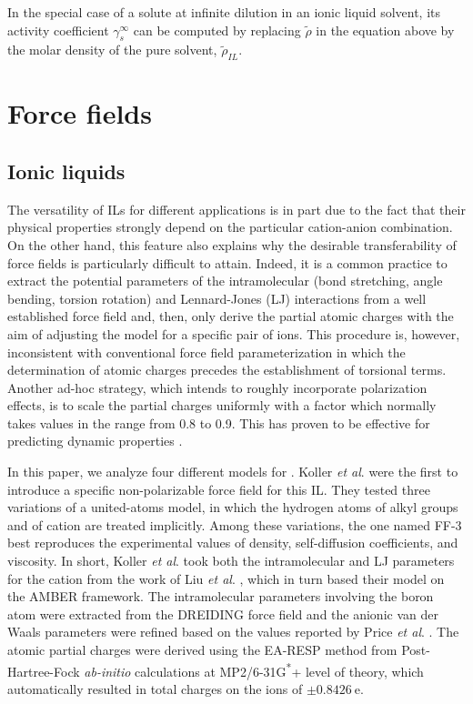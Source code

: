 \documentclass[3p,twocolumn]{elsarticle}
\begin{document}
In the special case of a solute at infinite dilution in an ionic liquid solvent, its activity coefficient $\gamma^\infty_s$ can be computed by replacing $\tilde{\rho}$ in the equation above by the molar density of the pure solvent, $\tilde{\rho}_\textit{IL}$.

\section{Force fields}
\label{sec:force_field}

\subsection{Ionic liquids}
\label{sec:force_field_il}

The versatility of ILs for different applications is in part due to the fact that their physical properties strongly depend on the particular cation-anion combination.
On the other hand, this feature also explains why the desirable transferability of force fields is particularly difficult to attain.
Indeed, it is a common practice to extract the potential parameters of the intramolecular (bond stretching, angle bending, torsion rotation) and Lennard-Jones (LJ) interactions from a well established force field and, then, only derive the partial atomic charges with the aim of adjusting the model for a specific pair of ions.
This procedure is, however, inconsistent with conventional force field parameterization in which the determination of atomic charges precedes the establishment of torsional terms.
Another ad-hoc strategy, which intends to roughly incorporate polarization effects, is to scale the partial charges uniformly with a factor which normally takes values in the range from 0.8 to 0.9.
This has proven to be effective for predicting dynamic properties \cite{Schr_der_2012}.

In this paper, we analyze four different models for \ce{[emim][B(CN)_4]}.
Koller \textit{et al}. \cite{Koller_2012} were the first to introduce a specific non-polarizable force field for this IL.
They tested three variations of a united-atoms model, in which the hydrogen atoms of alkyl groups  and  of cation \ce{[emim]^+} are treated implicitly.
Among these variations, the one named FF-3 best reproduces the experimental values of density, self-diffusion coefficients, and viscosity.
In short, Koller \textit{et al}. \cite{Koller_2012} took both the intramolecular and LJ parameters for the cation from the work of Liu \textit{et al}. \cite{Liu_2006}, which in turn based their model on the AMBER \cite{Cornell_1995} framework.
The intramolecular parameters involving the boron atom were extracted from the DREIDING \cite{Mayo_1990} force field and the anionic van der Waals parameters were refined based on the values reported by Price \textit{et al}. \cite{Price_2001}.
The atomic partial charges were derived using the EA-RESP method \cite{Basma_2001} from Post-Hartree-Fock \textit{ab-initio} calculations at MP2/6-31G\textsuperscript{*}+ level of theory, which automatically resulted in total charges on the ions of $\pm0.8426~\mathrm{e}$.
\end{document}
